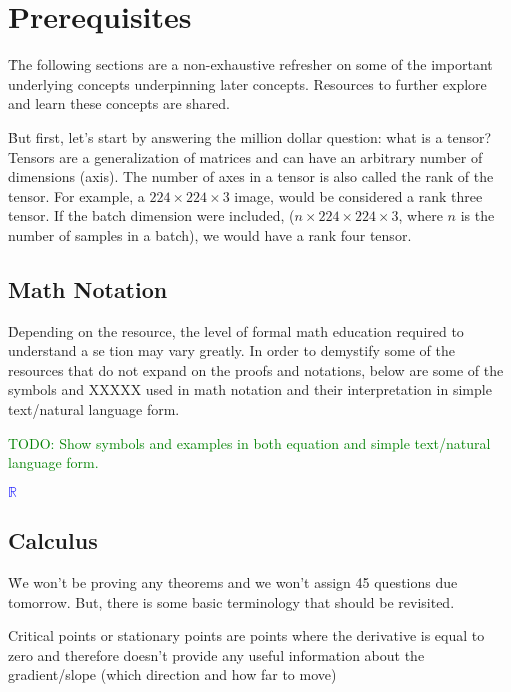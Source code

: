 \chapter{Prerequisites}

\r{The following sections are a non-exhaustive refresher on some of the important underlying concepts underpinning later concepts. Resources to further explore and learn these concepts are shared.}

\r{But first, let's start by answering the million dollar question: what is a tensor?  {Tensors} are a generalization of matrices and can have an arbitrary number of dimensions (axis). The number of axes in a tensor is also called the {rank} of the tensor. For example, a $224\times224\times3$ image, would be considered a rank three tensor. If the batch dimension were included, ($n\times224\times224\times3$, where $n$ is the number of samples in a batch), we would have a rank four tensor.}


\section{Math Notation}

\r{Depending on the resource, the level of formal math education required to understand a se tion may vary greatly. In order to demystify some of the resources that do not expand on the proofs and notations, below are some of the symbols and XXXXX used in math notation and their interpretation in simple text/natural language form.}

\textcolor{green}{TODO: Show symbols and examples in both equation and simple text/natural language form.}

\textcolor{blue}{$\mathbb{R}$}

\section{Calculus}



\r{We won't be proving any theorems and we won't assign 45 questions due tomorrow. But, there is some basic terminology that should be revisited.}

\r{{Critical points} or {stationary points} are points where the derivative is equal to zero and therefore doesn't provide any useful information about the gradient/slope (which direction and how far to move)}


